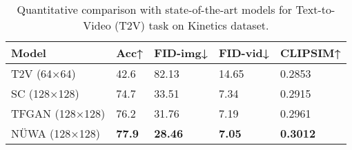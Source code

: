 \documentclass[10pt,twocolumn,letterpaper]{article}
\begin{document}
\newcommand{\swidth}{1cm}
\begin{table}[t]
\footnotesize
\begin{center}
\caption{Quantitative comparison with state-of-the-art models for Text-to-Video (T2V) task on Kinetics dataset.}
\label{tab:t2v}
\tabcolsep=0.11cm
\begin{tabular}{p{2.7cm}p{0.7cm}p{1.2cm}p{1.2cm}p{1.3cm}}
\toprule
Model             & Acc↑     & FID-img↓      & FID-vid↓    & CLIPSIM↑ \\
\midrule
T2V  (64×64) \cite{liVideoGenerationText2018}       & 42.6     & 82.13     & 14.65       & 0.2853        \\
SC  (128×128) \cite{balajiConditionalGANDiscriminative2019}        & 74.7     & 33.51     & 7.34        & 0.2915        \\
TFGAN (128×128)\cite{balajiConditionalGANDiscriminative2019}     & 76.2     & 31.76     & 7.19        & 0.2961        \\
\midrule
NÜWA (128×128)     & \textbf{77.9}     & \textbf{28.46}     & \textbf{7.05}         & \textbf{0.3012}        \\
\bottomrule
\end{tabular}
\end{center}
\vspace{-6mm}
\end{table}
\end{document}
